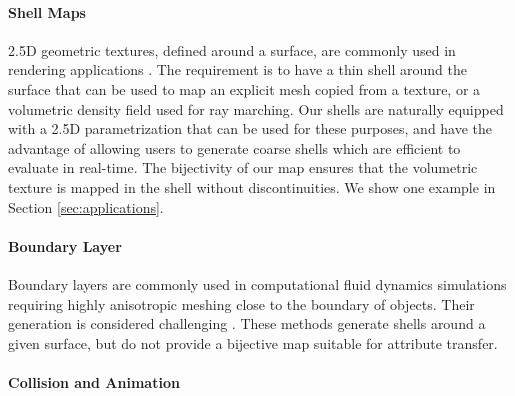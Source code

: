 \paragraph{Shell Maps}
2.5D geometric textures, defined around a surface, are commonly used in rendering applications \cite{wang2003view,wang2004generalized,porumbescu2005shell,peng2004interactive,lengyel2001real,chen2004shell,huang2007gradient,jin2019shell}. The requirement is to have a thin shell around the surface that can be used to map an explicit mesh copied from a texture, or a volumetric density field used for ray marching. Our shells are naturally equipped with a 2.5D parametrization that can be used for these purposes, and have the advantage of allowing users to  generate coarse shells which are efficient to evaluate in real-time. The bijectivity of our map ensures that the  volumetric texture is mapped in the shell without discontinuities. We show one example in Section \ref{sec:applications}.

\paragraph{Boundary Layer}

Boundary layers are commonly used in computational fluid dynamics simulations requiring highly anisotropic meshing close to the boundary of objects. Their generation is considered challenging \cite{aubry2015most,aubry2017boundary,garimella2000boundary}. These methods generate shells around a given surface, but do not provide a bijective map suitable for attribute transfer.

\paragraph{Collision and Animation}

